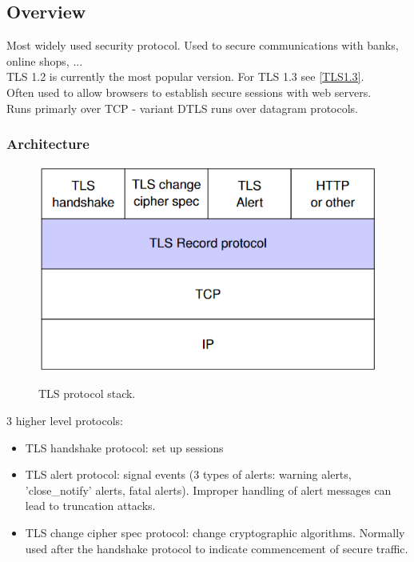 \documentclass{article}
\begin{document}
\subsection{Overview}

Most widely used security protocol. Used to secure communications with banks, online shops, ...\\
TLS 1.2 is currently the most popular version. For TLS 1.3 see \ref{TLS1.3}.\\
Often used to allow browsers to establish secure sessions with web servers.\\
Runs primarly over TCP - variant DTLS runs over datagram protocols.

\subsubsection{Architecture}

\noindent\begin{minipage}{0.54\textwidth}%
\begin{figure}[H]
\centering
\includegraphics[scale=0.55]{Images/tlsprotocolstack.png}
\label{fig:fround}
\caption{TLS protocol stack.}
\end{figure}
\end{minipage}%
\hfill%
\begin{minipage}{0.55\textwidth}
3 higher level protocols:
\begin{itemize}
    \item TLS handshake protocol: set up sessions
    \item TLS alert protocol: signal events (3 types of alerts: warning alerts, 'close\_notify' alerts, fatal alerts). Improper handling of alert messages can lead to truncation attacks.
    \item TLS change cipher spec protocol: change cryptographic algorithms. Normally used after the handshake protocol to indicate commencement of secure traffic.
\end{itemize}
\end{minipage}
\end{document}
